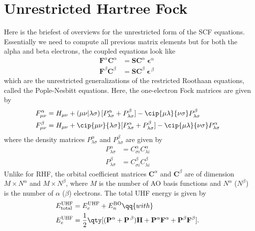 \documentclass[11pt]{article}
\begin{document}
\section{Unrestricted Hartree Fock}
Here is the briefest of overviews for the unrestricted form of the SCF equations. Essentially we need to compute all previous matrix elements but for both the alpha and beta electrons, the coupled equations look like
\begin{align}
\mathbf{F}^{\alpha}\mathbf{C}^{\alpha} &= \mathbf{SC}^{\alpha}{\bm{\upvarepsilon}}^{\alpha} \\
\mathbf{F}^{\beta}\mathbf{C}^{\beta} &= \mathbf{SC}^{\beta}{\bm{\upvarepsilon}}^{\,\beta}
\end{align}
which are the unrestricted generalizations of the restricted Roothaan equations, called the Pople-Nesbitt equations. Here, the one-electron Fock matrices are given by
\begin{align}
F_{\mu\nu}^{\alpha} &= H_{\mu\nu} + (\mu\nu|\lambda\sigma)\,[P_{\lambda\sigma}^{\alpha} + P_{\lambda\sigma}^{\beta}] - \cip{\mu\lambda}{\nu\sigma} P_{\lambda\sigma}^{\beta}\\
F_{\mu\nu}^{\beta} &= H_{\mu\nu} + \cip{\mu\nu}{\lambda\sigma}[P_{\lambda\sigma}^{\alpha} + P_{\lambda\sigma}^{\beta}] - \cip{\mu\lambda}{\nu\sigma}P_{\lambda\sigma}^{\alpha}
\end{align}
where the density matrices $P_{\lambda\sigma}^{\alpha}$ and $P_{\lambda\sigma}^{\beta}$ are given by
\begin{align}
P_{\lambda\sigma}^{\alpha} &= C_{\sigma i}^{\alpha}C_{\lambda i}^{\alpha}\\
P_{\lambda\sigma}^{\beta} &= C_{\sigma i}^{\beta}C_{\lambda i}^{\beta}
\end{align}
Unlike for RHF, the orbital coefficient matrices $\mathbf{C}^{\alpha}$ and $\mathbf{C}^{\beta}$ are of dimension $M\times N^{\alpha}$ and $M\times N^{\beta}$, where $M$ is the number of AO basis functions and $N^{\alpha}$ ($N^{\beta}$) is the number of $\alpha$ ($\beta$) electrons.  The total UHF energy is given by
\begin{align}
E^{\text{UHF}}_{\text{total}} &= E^{\text{UHF}}_{e} + E^{\text{BO}}_{n}\qq{with}\\
E^{\text{UHF}}_{e} &= \frac{1}{2}\qty[(\mathbf{P}^{\alpha} + \mathbf{P}^{\,\beta}){\bf H} + 
\mathbf{P}^{\alpha}\mathbf{F}^{\alpha} + \mathbf{P}^{\beta}\mathbf{F}^{\beta}].
\end{align}
\end{document}

